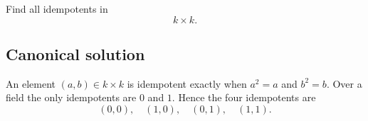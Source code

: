 
\begin{exercise}
	Find all idempotents in
	\[
	k\times k.
	\]
\end{exercise}

\subsection*{Canonical solution}
An element $(a,b)\in k\times k$ is idempotent exactly when $a^2=a$ and $b^2=b$. Over a field the only idempotents are $0$ and $1$. Hence the four idempotents are
\[
(0,0),\quad(1,0),\quad(0,1),\quad(1,1).
\]
